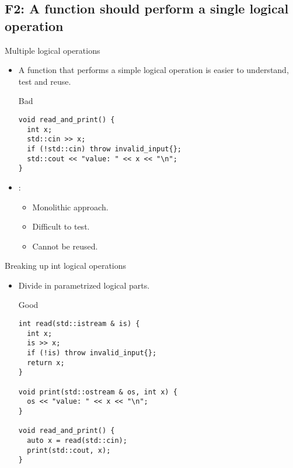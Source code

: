 \subsection{F2: A function should perform a single logical operation}

\begin{frame}[t,fragile]{Multiple logical operations}
\begin{itemize}
  \item A function that performs a simple logical operation is easier to
        understand, test and reuse.

\begin{block}{Bad}
\begin{lstlisting}
void read_and_print() {
  int x;
  std::cin >> x;
  if (!std::cin) throw invalid_input{};
  std::cout << "value: " << x << "\n";
}
\end{lstlisting}
\end{block}

  \item {}:
    \begin{itemize}
      \item Monolithic approach.
      \item Difficult to test.
      \item Cannot be reused.
    \end{itemize}
\end{itemize}
\end{frame}

\begin{frame}[t,fragile]{Breaking up int logical operations}
\begin{itemize}
  \item Divide in parametrized logical parts.

\begin{block}{Good}
\begin{lstlisting}
int read(std::istream & is) {
  int x;
  is >> x;
  if (!is) throw invalid_input{};
  return x;
}

void print(std::ostream & os, int x) {
  os << "value: " << x << "\n";
}

void read_and_print() {
  auto x = read(std::cin);
  print(std::cout, x);
}
\end{lstlisting}
\end{block}

\end{itemize}
\end{frame}

